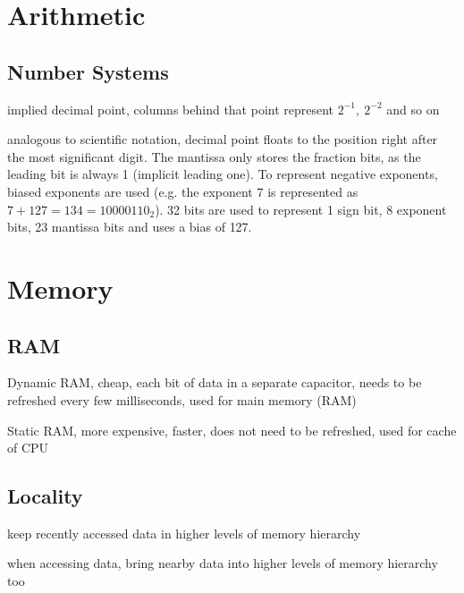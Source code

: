 \documentclass[11pt]{article}
\begin{document}
\section{Arithmetic}

\subsection{Number Systems}

\begin{description}[labelindent=16pt,style=multiline,leftmargin=4cm, noitemsep]
	\item[fixed-point:] implied decimal point, columns behind that point represent $2^{-1},\ 2^{-2}$ and so on	
	\item[floating-point:] analogous to scientific notation, decimal point floats to the position right after the most significant digit. The mantissa only stores the fraction bits, as the leading bit is always 1 (implicit leading one). To represent negative exponents, biased exponents are used (e.g. the exponent $7$ is represented as $7+127 = 134 = 10000110_2$). 32  bits  are used to represent 1 sign bit, 8 exponent bits, 23 mantissa bits and uses a bias of 127.
\end{description}

\section{Memory}

\subsection{RAM}

\begin{description}[labelindent=16pt,style=multiline,leftmargin=3cm, noitemsep]
	\item[DRAM:] Dynamic RAM, cheap, each bit of data in a separate capacitor, needs to be refreshed every few milliseconds, used for main memory (RAM)
	\item[SRAM:] Static RAM, more expensive, faster, does not need to be refreshed, used for cache of CPU
\end{description}

\subsection{Locality}

\begin{description}[labelindent=16pt,style=multiline,leftmargin=5cm, noitemsep]
	\item[Temporal Locality:] keep recently accessed data in higher levels of memory hierarchy
	\item[Spatial Locality:] when accessing data, bring nearby data into higher levels of memory hierarchy too
\end{description}
\end{document}
